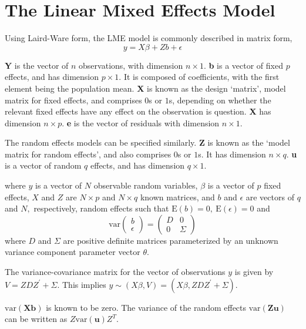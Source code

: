 \documentclass[12pt, a4paper]{report}
\theoremstyle{plain}
\theoremstyle{definition}
\theoremstyle{remark}
\begin{document}
\newpage

\section{The Linear Mixed Effects Model}

Using Laird-Ware form, the LME model is commonly described in matrix form,
\begin{equation}
y = X\beta + Zb + \epsilon
\label{LW}
\end{equation}

\textbf{Y} is the vector of $n$ observations, with dimension $n
\times 1$. \textbf{b} is a vector of fixed $p$ effects, and has
dimension $p \times 1$. It is composed of coefficients, with the
first element being the population mean.  \textbf{X} is known as
the design `matrix', model matrix for fixed effects, and comprises
$0$s or $1$s, depending on whether the relevant fixed effects have
any effect on the observation is question. \textbf{X} has
dimension $n \times p$. \textbf{e} is the vector of residuals with
dimension $n \times 1$.

The random effects models can be specified similarly. \textbf{Z}
is known as the `model matrix for random effects', and also
comprises $0$s or $1$s. It has dimension $n \times q$. \textbf{u
}is a vector of random $q$ effects, and has dimension $q \times
1$.


where $y$ is a vector of $N$ observable random variables, $\beta$ is a vector of $p$ fixed effects, $X$ and $Z$ are $N \times p$ and $N \times q$ known matrices, and $b$ and $\epsilon$  are vectors of $q$ and $N,$ respectively, random effects such that $\mathrm{E}(b)=0, \ \mathrm{E}(\epsilon)=0$
and
\[
	\mathrm{var} \begin{pmatrix}
			b \\
		\epsilon \end{pmatrix}  =
	\begin{pmatrix}
		D & 0 \\
		0 & \Sigma \end{pmatrix} \]
where $D$ and $\Sigma$ are positive definite matrices parameterized by an unknown variance component parameter vector $ \theta.$ 

The variance-covariance matrix for the vector of observations $y$ is given by $V = ZDZ^{\prime}+ \Sigma.$ This implies $y \sim(X\beta, V) = (X\beta,ZDZ^{\prime}+ \Sigma)$. 

$\mbox{var}(\textbf{Xb})$ is known to be zero. The variance of the
random effects $\mbox{var}(\textbf{Zu})$ can be written as
$Z\mbox{var}(\textbf{u})Z^{T}$.
\end{document}
